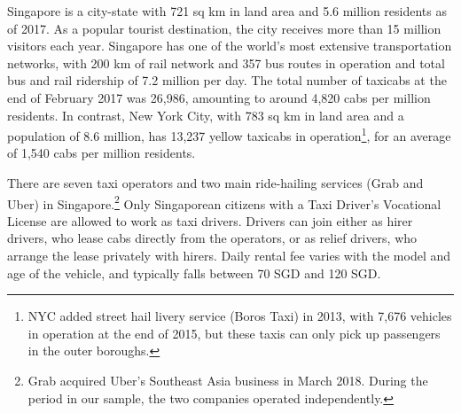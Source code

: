 \documentclass[reviewmode,AEJ]{AEA}
\begin{document}
Singapore is a city-state with 721 sq km in land area and 5.6 million residents as of 2017. 
As a popular tourist destination, the city receives more than 15 million visitors each year.
Singapore has one of the world's most extensive transportation networks, with 200 km of rail network and
357 bus routes in operation
and total bus and rail ridership of 7.2 million per day.  
The total number of taxicabs at the end of February 2017 was 26,986, amounting to around 4,820 cabs
per million residents. In contrast, New York City, with 783 sq km in land area and a population of
8.6 million, has 13,237 yellow taxicabs in operation\footnote{NYC added street hail livery service
(Boros Taxi) in 2013, with 7,676 vehicles in operation at the end of 2015, but these taxis can only
pick up passengers in the outer boroughs.}, for an average of 1,540 cabs per million residents.

There are seven taxi operators 
and two main ride-hailing services (Grab and Uber) in Singapore.\footnote{Grab acquired Uber's
Southeast Asia business in March 2018. %
During the period in our sample, the two companies operated independently.} Only Singaporean citizens
with a Taxi Driver's Vocational License are allowed to work as taxi drivers. Drivers can join either 
as hirer drivers, who lease cabs directly from the operators, or as relief drivers, who arrange the 
lease privately with hirers. Daily rental fee varies with the model and age of the vehicle, 
and typically falls between 70 SGD and 120 SGD.
\end{document}
